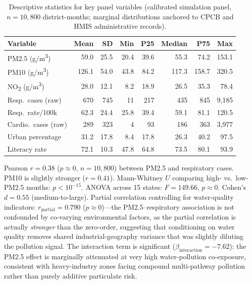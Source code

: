 \documentclass{article}
\begin{document}
\begin{table}[ht]
  \caption{Descriptive statistics for key panel variables (calibrated simulation panel, $n = 10{,}800$ district-months; marginal distributions anchored to CPCB and HMIS administrative records).}
  \label{tab:descriptive}
  \centering
  \small
  \begin{tabular}{lrrrrrrr}
    \toprule
    Variable & Mean & SD & Min & P25 & Median & P75 & Max \\
    \midrule
    PM2.5 (\textmu{}g/m\textsuperscript{3}) & 59.0 & 25.5 & 20.4 & 39.6 & 55.3 & 74.2 & 153.1 \\
    PM10 (\textmu{}g/m\textsuperscript{3})  & 126.1 & 54.0 & 43.8 & 84.2 & 117.3 & 158.7 & 320.5 \\
    NO\textsubscript{2} (\textmu{}g/m\textsuperscript{3}) & 28.0 & 12.1 & 8.2 & 18.9 & 26.5 & 35.3 & 78.4 \\
    Resp.\ cases (raw)  & 670 & 745 & 11 & 217 & 435 & 845 & 9{,}185 \\
    Resp.\ rate/100k    & 62.3 & 24.4 & 25.8 & 39.4 & 59.1 & 81.1 & 120.5 \\
    Cardio.\ cases (raw)& 289 & 323 & 4  & 93  & 186 & 363 & 3{,}977 \\
    Urban percentage    & 31.2 & 17.8 & 8.4 & 17.8 & 26.3 & 40.2 & 97.5 \\
    Literacy rate       & 72.1 & 10.3 & 47.8 & 64.8 & 73.5 & 80.1 & 93.9 \\
    \bottomrule
  \end{tabular}
\end{table}

Pearson $r = 0.38$ ($p \approx 0$, $n = 10{,}800$) between PM2.5 and respiratory cases.
PM10 is slightly stronger ($r = 0.41$). Mann-Whitney $U$ comparing high- vs.\ low-PM2.5
months: $p < 10^{-15}$. ANOVA across 15 states: $F = 149.66$, $p \approx 0$. Cohen's
$d = 0.55$ (medium-to-large). Partial correlation controlling for water-quality indicators:
$r_{\text{partial}} = 0.790$ ($p \approx 0$)---the PM2.5--respiratory association is not
confounded by co-varying environmental factors, as the partial correlation is actually
\emph{stronger} than the zero-order, suggesting that conditioning on water quality removes
shared industrial-geography variance that was slightly diluting the pollution signal. The
interaction term is significant ($\beta_{\text{interaction}} = -7.62$): the PM2.5 effect
is marginally attenuated at very high water-pollution co-exposure, consistent with
heavy-industry zones facing compound multi-pathway pollution rather than purely additive
particulate risk.
\end{document}
